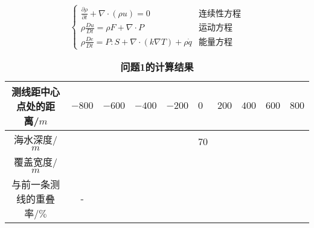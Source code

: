 


\begin{equation}
    \begin{cases}
        \frac{\partial\rho}{\partial t} + \nabla \cdot (\rho u) = 0 &\text{连续性方程}  \\
        \rho \frac{Du}{Dt} = \rho F + \nabla \cdot P &\text{运动方程}    \\
        \rho \frac{De}{Dt} = P:S + \nabla \cdot (k\nabla T) + \rho \dot{q}  &\text{能量方程}
    \end{cases}
\end{equation}


\begin{table}[h]
    \centering
    \caption{\textbf{问题1的计算结果}}
    \begin{tabular}{@{}ccllllllll@{}}
    \toprule
    测线距中心点处的距离/$m$  & $-800$ & $-600$ & $-400$ & $-200$ & $0$ & $200$ & $400$ & $600$ & $800$ \\ \midrule
    海水深度/$m$        &      &      &      &      & 70  &     &     &     &     \\
    覆盖宽度/$m$        &      &      &      &      &   &     &     &     &     \\
    与前一条测线的重叠率/$\%$ &   -  &      &      &      &   &     &     &     &     \\ \bottomrule
    \end{tabular}
\end{table}



